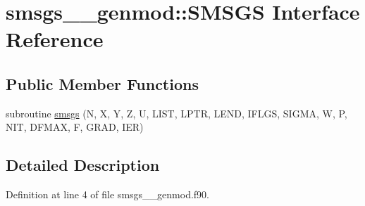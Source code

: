 \hypertarget{interfacesmsgs____genmod_1_1SMSGS}{\section{smsgs\+\_\+\+\_\+genmod\+:\+:S\+M\+S\+G\+S Interface Reference}
\label{interfacesmsgs____genmod_1_1SMSGS}
}
\subsection*{Public Member Functions}
\begin{DoxyCompactItemize}
\item 
subroutine \hyperlink{interfacesmsgs____genmod_1_1SMSGS_ac7580bf63fdea3cac3c489e50702306c}{smsgs} (N, X, Y, Z, U, L\+I\+S\+T, L\+P\+T\+R, L\+E\+N\+D, I\+F\+L\+G\+S, S\+I\+G\+M\+A, W, P, N\+I\+T, D\+F\+M\+A\+X, F, G\+R\+A\+D, I\+E\+R)
\end{DoxyCompactItemize}


\subsection{Detailed Description}


Definition at line 4 of file smsgs\+\_\+\+\_\+genmod.\+f90.



